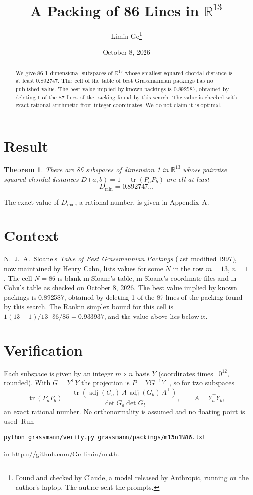 \documentclass[11pt,a4paper]{article}
\title{A Packing of 86 Lines in $\mathbb{R}^{13}$}
\author{Limin Ge\thanks{Found and checked by Claude, a model released by Anthropic, running on the author's laptop. The author sent the prompts.}}
\date{October 8, 2026}
\newtheorem*{theorem}{Theorem}
\begin{document}
\maketitle
\begin{abstract}
We give 86 1-dimensional subspaces of $\mathbb{R}^{13}$ whose smallest squared chordal distance is at least 0.892747. This cell of the table of best Grassmannian packings has no published value. The best value implied by known packings is 0.892587, obtained by deleting 1 of the 87 lines of the packing found by this search. The value is checked with exact rational arithmetic from integer coordinates. We do not claim it is optimal.
\end{abstract}

\section{Result}
\begin{theorem}
There are 86 subspaces of dimension 1 in $\mathbb{R}^{13}$ whose pairwise squared chordal distances $D(a,b) = 1 - \operatorname{tr}(P_aP_b)$ are all at least
\[ D_{\min} = 0.892747\ldots \]
\end{theorem}
The exact value of $D_{\min}$, a rational number, is given in Appendix~A.


\section{Context}
N.~J.~A.~Sloane's \emph{Table of Best Grassmannian Packings} (last modified 1997), now maintained by Henry Cohn, lists values for some $N$ in the row $m=13$, $n=1$. The cell $N=86$ is blank in Sloane's table, in Sloane's coordinate files and in Cohn's table as checked on October 8, 2026. The best value implied by known packings is 0.892587, obtained by deleting 1 of the 87 lines of the packing found by this search. The Rankin simplex bound for this cell is $1(13-1)/13\cdot 86/85 = 0.933937$, and the value above lies below it.


\section{Verification}
Each subspace is given by an integer $m\times n$ basis $Y$ (coordinates times $10^{12}$, rounded). With $G=Y^\top Y$ the projection is $P=YG^{-1}Y^\top$, so for two subspaces
\[ \operatorname{tr}(P_aP_b)=\frac{\operatorname{tr}(\operatorname{adj}(G_a)\,A\,\operatorname{adj}(G_b)\,A^\top)}{\det G_a\det G_b},\qquad A=Y_a^\top Y_b, \]
an exact rational number. No orthonormality is assumed and no floating point is used. Run
\begin{verbatim}
python grassmann/verify.py grassmann/packings/m13n1N86.txt
\end{verbatim}
in \url{https://github.com/Ge-limin/math}.
\end{document}
